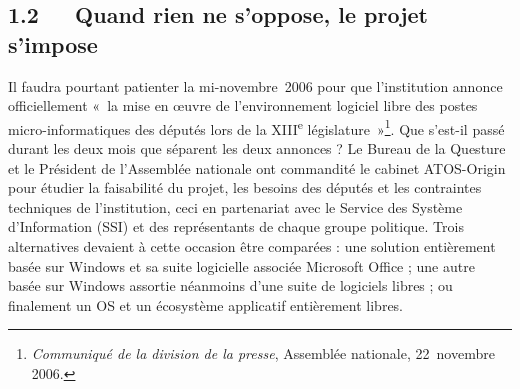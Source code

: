 \documentclass{FramateX}
\begin{document}
\begin{refsection}
\subsection*{1.2~~~Quand rien ne s'oppose, le projet s'impose}
{}

Il faudra pourtant patienter la mi-novembre~2006 pour que l'institution
annonce officiellement «~la mise en œuvre de l'environnement logiciel
libre des postes micro-informatiques des députés lors de la
XIII\textsuperscript{e} législature~»\footnote{\textit{Communiqué de la
division de la presse}, Assemblée nationale, 22~novembre 2006.}. Que
s'est-il passé durant les deux mois que séparent les deux annonces ? Le
Bureau de la Questure et le Président de l'Assemblée nationale ont
commandité le cabinet ATOS-Origin pour étudier la faisabilité du
projet, les besoins des députés et les contraintes techniques de
l'institution, ceci en partenariat avec le Service des Système
d'Information (SSI) et des représentants de chaque groupe politique.
Trois alternatives devaient à cette occasion être comparées : une
solution entièrement basée sur Windows et sa suite logicielle associée
Microsoft Office ; une autre basée sur Windows assortie néanmoins d'une
suite de logiciels libres ; ou finalement un OS et un écosystème
applicatif entièrement libres.


\end{refsection}
\end{document}
